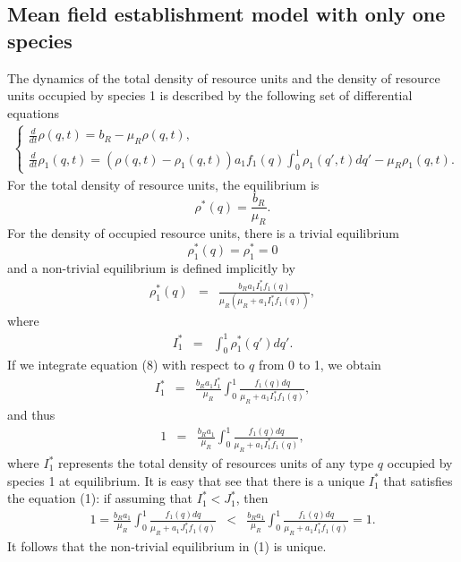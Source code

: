 \documentclass[8pt,a4paper]{article}
\begin{document}
\subsection{Mean field  establishment model with only one species}
The dynamics of the total density of resource units and the density of resource units occupied by species 1 is described by the following set of differential equations
\begin{eqnarray}
\begin{cases}
\frac{\displaystyle{d}}{\displaystyle{dt}}\rho(q,t)= b_R-\mu_R \rho(q,t),\\
\frac{\displaystyle{d}}{\displaystyle{dt}}\rho_1(q,t)= (\rho(q,t)-\rho_1(q,t)) a_1  f_1(q)\displaystyle{\int_0^1} \rho_1(q',t) dq'-\mu_R \rho_1(q,t).
\end{cases}
\end{eqnarray}
For the total density of resource units, the equilibrium is $$\rho^*(q)=\frac{b_R}{\mu_R}.$$
For the density of occupied resource units, there is a trivial equilibrium 
$$\rho_1^*(q)=\rho_1^*=0$$
and a non-trivial equilibrium is  defined implicitly by
\begin{eqnarray}
\rho_1^*(q)&=& \frac{b_R a_1 I_1^*f_1(q)}{\mu_R (\mu_R + a_1 I_1^* f_1(q))},
\end{eqnarray}
where
\begin{eqnarray*}
I_1^* &=& \int_0^1 \rho_1^*(q') dq'.
\end{eqnarray*}
If we integrate equation (8) with respect to $q$ from 0 to 1, we obtain
\begin{eqnarray*}
I_1^* &=& \frac{b_R a_1 I_1^*}{\mu_R}\int_0^1 \frac{f_1(q)dq}{\mu_R+ a_1 I_1^* f_1(q)}, 
\end{eqnarray*} 
and thus
\begin{eqnarray}
1 &=& \frac{b_R a_1}{\mu_R} \int_0^1 \frac{f_1(q)dq}{\mu_R+ a_1 I_1^* f_1(q)},
\end{eqnarray} 
where $I_1^*$ represents the total density of resources units of any type $q$ occupied by species 1 at equilibrium. It is easy that see that there is a unique $I_1^*$ that satisfies the equation (1): if assuming that $I_1^*<J_1^*$, then 
\begin{eqnarray*}
1 = \frac{b_R a_1}{\mu_R} \int_0^1 \frac{f_1(q)dq}{\mu_R+ a_1 J_1^* f_1(q)} & < & \frac{b_R a_1}{\mu_R} \int_0^1 \frac{f_1(q)dq}{\mu_R+ a_1 I_1^* f_1(q)}=1.
\end{eqnarray*}
It follows that the non-trivial equilibrium in (1) is unique.
\end{document}
